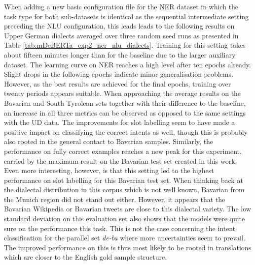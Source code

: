 \documentclass[11pt,a4paper,twoside,openright]{scrbook}
\begin{document}
When adding a new basic configuration file for the NER dataset in which the task type for both sub-datasets is identical as the sequential intermediate setting preceding the NLU configuration, this leads leads to the following results on Upper German dialects averaged over three random seed runs as presented in Table \ref{tab:mDeBERTa_exp2_ner_nlu_dialects}. Training for this setting takes about fifteen minutes longer than for the baseline due to the larger auxiliary dataset. The learning curve on NER reaches a high level after ten epochs already. Slight drops in the following epochs indicate minor generalisation problems. However, as the best results are achieved for the final epochs, training over twenty periods appears suitable. When approaching the average results on the Bavarian and South Tyrolean sets together with their difference to the baseline, an increase in all three metrics can be observed as opposed to the same settings with the UD data. The improvements for slot labelling seem to have made a positive impact on classifying the correct intents as well, though this is probably also rooted in the general contact to Bavarian samples. Similarly, the performance on fully correct examples reaches a new peak for this experiment, carried by the maximum result on the Bavarian test set created in this work. Even more interesting, however, is that this setting led to the highest performance on slot labelling for this Bavarian test set. When thinking back at the dialectal distribution in this corpus which is not well known, Bavarian from the Munich region did not stand out either. However, it appears that the Bavarian Wikipedia or Bavarian tweets are close to this dialectal variety. The low standard deviation on this evaluation set also shows that the models were quite sure on the performance this task. This is not the case concerning the intent classification for the parallel set \textit{de-ba} where more uncertainties seem to prevail. The improved performance on this is thus most likely to be rooted in translations which are closer to the English gold sample structure.
\end{document}
